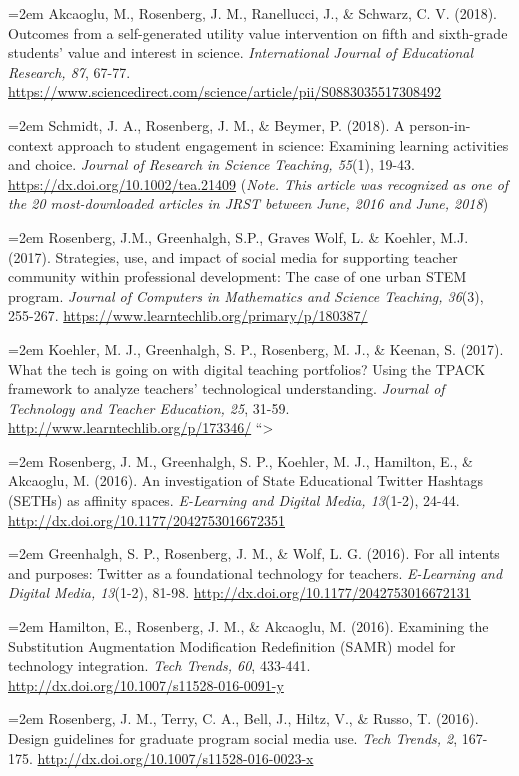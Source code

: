\documentclass[
  14,
]{article}
\begin{document}
\hangindent=2em Akcaoglu, M., Rosenberg, J. M., Ranellucci, J., \&
Schwarz, C. V. (2018). Outcomes from a self-generated utility value
intervention on fifth and sixth-grade students' value and interest in
science. \emph{International Journal of Educational Research, 87},
67-77.
\url{https://www.sciencedirect.com/science/article/pii/S0883035517308492}

\hangindent=2em Schmidt, J. A., Rosenberg, J. M., \& Beymer, P. (2018).
A person-in-context approach to student engagement in science: Examining
learning activities and choice. \emph{Journal of Research in Science
Teaching, 55}(1), 19-43. \url{https://dx.doi.org/10.1002/tea.21409}
(\emph{Note. This article was recognized as one of the 20
most-downloaded articles in JRST between June, 2016 and June, 2018})

\hangindent=2em Rosenberg, J.M., Greenhalgh, S.P., Graves Wolf, L. \&
Koehler, M.J. (2017). Strategies, use, and impact of social media for
supporting teacher community within professional development: The case
of one urban STEM program. \emph{Journal of Computers in Mathematics and
Science Teaching, 36}(3), 255-267.
\url{https://www.learntechlib.org/primary/p/180387/}

\hangindent=2em Koehler, M. J., Greenhalgh, S. P., Rosenberg, M. J., \&
Keenan, S. (2017). What the tech is going on with digital teaching
portfolios? Using the TPACK framework to analyze teachers' technological
understanding. \emph{Journal of Technology and Teacher Education, 25},
31-59. \url{http://www.learntechlib.org/p/173346/} ``\textgreater{}

\hangindent=2em Rosenberg, J. M., Greenhalgh, S. P., Koehler, M. J.,
Hamilton, E., \& Akcaoglu, M. (2016). An investigation of State
Educational Twitter Hashtags (SETHs) as affinity spaces.
\emph{E-Learning and Digital Media, 13}(1-2), 24-44.
\url{http://dx.doi.org/10.1177/2042753016672351}

\hangindent=2em Greenhalgh, S. P., Rosenberg, J. M., \& Wolf, L. G.
(2016). For all intents and purposes: Twitter as a foundational
technology for teachers. \emph{E-Learning and Digital Media, 13}(1-2),
81-98. \url{http://dx.doi.org/10.1177/2042753016672131}

\hangindent=2em Hamilton, E., Rosenberg, J. M., \& Akcaoglu, M. (2016).
Examining the Substitution Augmentation Modification Redefinition (SAMR)
model for technology integration. \emph{Tech Trends, 60}, 433-441.
\url{http://dx.doi.org/10.1007/s11528-016-0091-y}

\hangindent=2em Rosenberg, J. M., Terry, C. A., Bell, J., Hiltz, V., \&
Russo, T. (2016). Design guidelines for graduate program social media
use. \emph{Tech Trends, 2}, 167-175.
\url{http://dx.doi.org/10.1007/s11528-016-0023-x}
\end{document}
